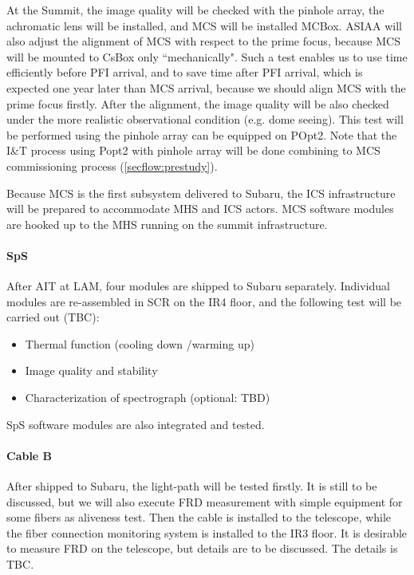 At the Summit, the image quality will be checked with the pinhole array, the achromatic lens will be installed, and MCS will be installed MCBox.
ASIAA will also adjust the alignment of MCS with respect to the prime focus, because MCS will be mounted to CsBox only ``mechanically".
Such a test enables us to use time efficiently before PFI arrival, and to save time after PFI arrival, which is expected one year later than MCS arrival, because we should align MCS with the prime focus firstly.
After the alignment, the image quality will be also checked under the more realistic observational condition (e.g. dome seeing).
This test will be performed using the pinhole array can be equipped on POpt2.
Note that the I\&T process using Popt2 with pinhole array will be done combining to MCS commissioning process (\ref{secflow:prestudy}).

Because MCS is the first subsystem delivered to Subaru, the ICS infrastructure will be prepared to accommodate MHS and ICS actors.
MCS software modules are hooked up to the MHS running on the summit infrastructure.

\paragraph{SpS}
After AIT at LAM, four modules are shipped to Subaru separately.
Individual modules are re-assembled in SCR on the IR4 floor, and the following test will be carried out (TBC):
\begin{itemize}
\item Thermal function (cooling down /warming up)
\item Image quality and stability
\item Characterization of spectrograph  (optional: TBD)
\end{itemize}

SpS software modules are also integrated and tested.

\paragraph{Cable B}
After shipped to Subaru, the light-path will be tested firstly. 
It is still to be discussed, but we will also execute FRD measurement with simple equipment for some fibers as aliveness test.
Then the cable is installed to the telescope, while the fiber connection monitoring system is installed to the IR3 floor.
It is desirable to measure FRD on the telescope, but details are to be discussed.
The details is TBC.


